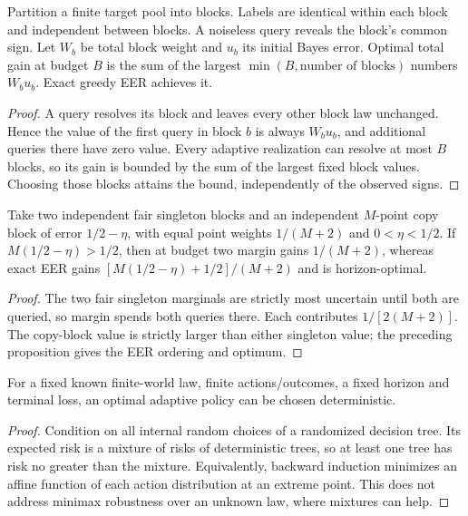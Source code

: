 \begin{proposition}
\label{prop:blocks-r3}
Partition a finite target pool into blocks. Labels are identical within
each block and independent between blocks. A noiseless query reveals
the block's common sign. Let $W_b$ be total block weight and $u_b$
its initial Bayes error. Optimal total gain at budget $B$ is the sum
of the largest $\min(B,\text{number of blocks})$ numbers $W_bu_b$.
Exact greedy EER achieves it.
\end{proposition}
\begin{proof}
A query resolves its block and leaves every other block law unchanged.
Hence the value of the first query in block $b$ is always $W_bu_b$,
and additional queries there have zero value. Every adaptive
realization can resolve at most $B$ blocks, so its gain is bounded
by the sum of the largest fixed block values. Choosing those blocks
attains the bound, independently of the observed signs.
\end{proof}

\begin{counterexample}
Take two independent fair singleton blocks and an independent
$M$-point copy block of error $1/2-\eta$, with equal point weights
$1/(M+2)$ and $0<\eta<1/2$. If $M(1/2-\eta)>1/2$, then at budget two
margin gains $1/(M+2)$, whereas exact EER gains
$[M(1/2-\eta)+1/2]/(M+2)$ and is horizon-optimal.
\end{counterexample}
\begin{proof}
The two fair singleton marginals are strictly most uncertain until
both are queried, so margin spends both queries there. Each contributes
$1/[2(M+2)]$. The copy-block value is strictly larger than either
singleton value; the preceding proposition gives the EER ordering
and optimum.
\end{proof}

\begin{proposition}
For a fixed known finite-world law, finite actions/outcomes, a fixed
horizon and terminal loss, an optimal adaptive policy can be chosen
deterministic.
\end{proposition}
\begin{proof}
Condition on all internal random choices of a randomized decision tree.
Its expected risk is a mixture of risks of deterministic trees, so at
least one tree has risk no greater than the mixture. Equivalently,
backward induction minimizes an affine function of each action
distribution at an extreme point. This does not address minimax
robustness over an unknown law, where mixtures can help.
\end{proof}

